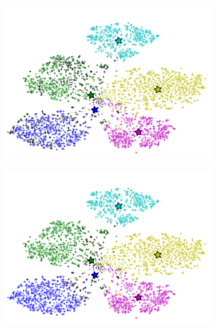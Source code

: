 \documentclass[letterpaper]{article}
\begin{document}
\begin{figure}[t]
\begin{subfigure}[b]{0.27\linewidth}
    \caption{}
    \label{fig:truth}
  \end{subfigure}
%
  \begin{subfigure}[b]{0.27\linewidth}
    \includegraphics[width=\linewidth]{figure_2}
    \caption{}
\label{fig:knn}
  \end{subfigure}
%
  \begin{subfigure}[b]{0.27\linewidth}
    \includegraphics[width=\linewidth]{figure_3_kmeans}

\end{subfigure}
\end{figure}
\end{document}
